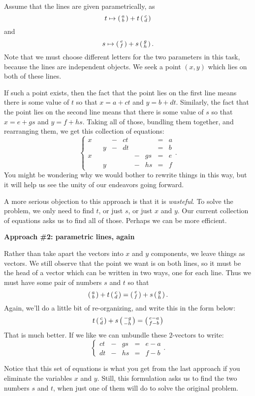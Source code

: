 \documentclass[00-livre-main.tex]{subfiles}
\begin{document}
Assume that the lines are given parametrically, as 
\[
t \mapsto \left(\begin{smallmatrix} a \\ b \end{smallmatrix}\right) + t \left(\begin{smallmatrix} c \\ d \end{smallmatrix}\right)
\]
and 
\[
s \mapsto \left(\begin{smallmatrix} e \\ f \end{smallmatrix}\right) + s \left(\begin{smallmatrix} g \\ h \end{smallmatrix}\right).
\]
Note that we must choose different letters for the two parameters in this task, because the lines are independent objects. We seek a point $(x,y)$ which lies on both of these lines. 

If such a point exists, then the fact that the point lies on the first line means there is some value of $t$ so that $x = a + ct$ and $y=b+dt$. Similarly, the fact that the point lies on the second line means that there is some value of $s$ so that $x=e+gs$ and $y=f+hs$. Taking all of those, bundling them together, and rearranging them, we get this collection of equations:
\[
\left\{ \begin{array}{cccccccccccc}
x & &   & - & ct &   &    & = & a\\ 
  & & y & - & dt &   &    & = & b\\
x & &   &   &    & - & gs & = & e\\ 
  & & y &   &    & - & hs & = & f
\end{array}\right. .
\]
You might be wondering why we would bother to rewrite things in this way, but it will help us see the unity of our endeavors going forward.

A more serious objection to this approach is that it is \emph{wasteful}. To solve the problem, we only need to find $t$, or just $s$, or just $x$ and $y$. Our current collection of equations asks us to find all of those. Perhaps we can be more efficient.


\noindent\textbf{Approach \#2: parametric lines, again}

Rather than take apart the vectors into $x$ and $y$ components, we leave things as vectors. We still observe that the point we want is on both lines, so it must be the 
head of a vector which can be written in two ways, one for each line. Thus we must have some pair of numbers $s$ and $t$ so that
\[
\left(\begin{smallmatrix} a \\ b \end{smallmatrix}\right) + t\left(\begin{smallmatrix} c \\ d \end{smallmatrix}\right) = \left(\begin{smallmatrix} e \\ f \end{smallmatrix}\right) + s\left(\begin{smallmatrix} g \\ h \end{smallmatrix}\right).
\]
Again, we'll do a little bit of re-organizing, and write this in the form below:
\[
 t\left(\begin{smallmatrix} c \\ d \end{smallmatrix}\right) + s\left(\begin{smallmatrix} -g \\ -h \end{smallmatrix}\right) = \left(\begin{smallmatrix} e-a \\ f-b \end{smallmatrix}\right)
\]
That is much better. If we like we can unbundle these $2$-vectors to write:
\[
\left\{ \begin{array}{ccccc}
ct & - & gs & = & e-a \\
dt & - & hs & = & f-b
\end{array}\right. .
\]

Notice that this set of equations is what you get from the last approach if you eliminate the variables $x$ and $y$. Still, this formulation asks us to find the two numbers $s$ and $t$, when just one of them will do to solve the original problem. 
\end{document}
